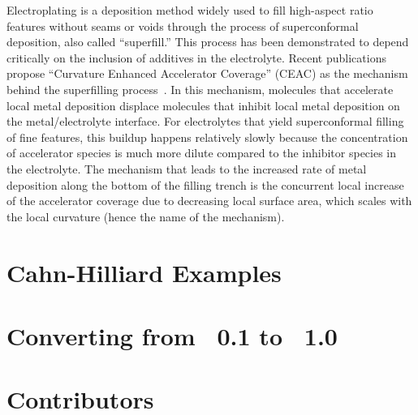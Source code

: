 \documentclass[letterpaper]{book}
\begin{document}
Electroplating is a deposition method widely used to fill high-aspect
ratio features without seams or voids through the process of
superconformal deposition, also called ``superfill.''  This process
has been demonstrated to depend critically on the inclusion of
additives in the electrolyte.  Recent publications propose ``Curvature
Enhanced Accelerator Coverage'' (CEAC) as the mechanism behind the
superfilling process~\cite{NIST:damascene:2001}.  In this mechanism,
molecules that accelerate local metal deposition displace molecules
that inhibit local metal deposition on the metal/electrolyte
interface. For electrolytes that yield superconformal filling of fine
features, this buildup happens relatively slowly because the
concentration of accelerator species is much more dilute compared to
the inhibitor species in the electrolyte.  The mechanism that leads to
the increased rate of metal deposition along the bottom of the filling
trench is the concurrent local increase of the accelerator coverage
due to decreasing local surface area, which scales with the local
curvature (hence the name of the mechanism).



\chapter{Cahn-Hilliard Examples}



\chapter{Converting from \FiPy{}~0.1 to \FiPy{}~1.0}
\label{chap:Update0.1to1.0}




\backmatter


\fussy

% 



\printindex

\appendix 


\chapter*{Contributors}
\label{chap:Contributors}



\end{document}
